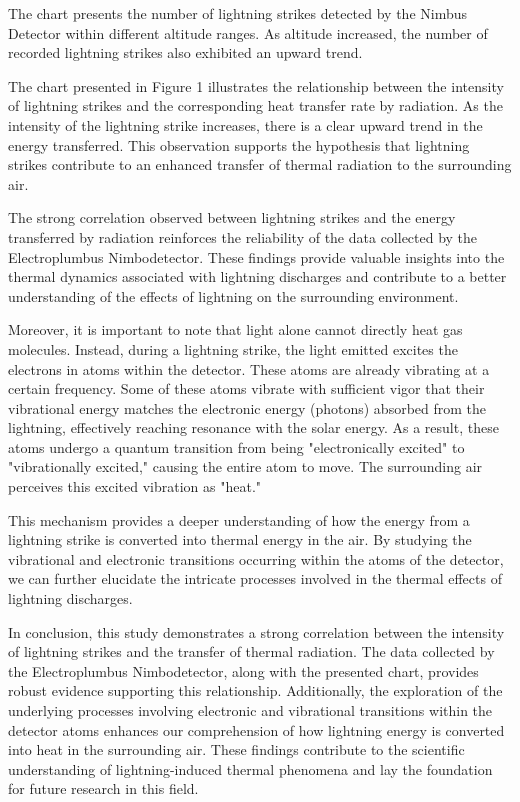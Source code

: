 \documentclass[english]{cenarticle}
\begin{document}
The chart presents the number of lightning strikes detected by the Nimbus Detector within different altitude ranges. As altitude increased, the number of recorded lightning strikes also exhibited an upward trend.\par
%
The chart presented in Figure 1 illustrates the relationship between the intensity of lightning strikes and the corresponding heat transfer rate by radiation. As the intensity of the lightning strike increases, there is a clear upward trend in the energy transferred. This observation supports the hypothesis that lightning strikes contribute to an enhanced transfer of thermal radiation to the surrounding air.\par
%
The strong correlation observed between lightning strikes and the energy transferred by radiation reinforces the reliability of the data collected by the Electroplumbus Nimbodetector. These findings provide valuable insights into the thermal dynamics associated with lightning discharges and contribute to a better understanding of the effects of lightning on the surrounding environment.\par
%
Moreover, it is important to note that light alone cannot directly heat gas molecules. Instead, during a lightning strike, the light emitted excites the electrons in atoms within the detector. These atoms are already vibrating at a certain frequency. Some of these atoms vibrate with sufficient vigor that their vibrational energy matches the electronic energy (photons) absorbed from the lightning, effectively reaching resonance with the solar energy. As a result, these atoms undergo a quantum transition from being "electronically excited" to "vibrationally excited," causing the entire atom to move. The surrounding air perceives this excited vibration as "heat."\par
%
This mechanism provides a deeper understanding of how the energy from a lightning strike is converted into thermal energy in the air. By studying the vibrational and electronic transitions occurring within the atoms of the detector, we can further elucidate the intricate processes involved in the thermal effects of lightning discharges.\par
%
In conclusion, this study demonstrates a strong correlation between the intensity of lightning strikes and the transfer of thermal radiation. The data collected by the Electroplumbus Nimbodetector, along with the presented chart, provides robust evidence supporting this relationship. Additionally, the exploration of the underlying processes involving electronic and vibrational transitions within the detector atoms enhances our comprehension of how lightning energy is converted into heat in the surrounding air. These findings contribute to the scientific understanding of lightning-induced thermal phenomena and lay the foundation for future research in this field.
\end{document}
